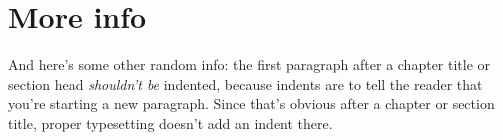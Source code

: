 \documentclass[12pt,twoside]{reedthesis}
\theoremstyle{plain}   %
\theoremstyle{definition}
\theoremstyle{remark}
\numberwithin{equation}{section}
\begin{document}
\section{More info}
And here's some other random info: the first paragraph after a chapter title or section head \emph{shouldn't be} indented, because indents are to tell the reader that you're starting a new paragraph. Since that's obvious after a chapter or section title, proper typesetting doesn't add an indent there. 





  \backmatter %

    \nocite{*}


%  
 

\end{document}
